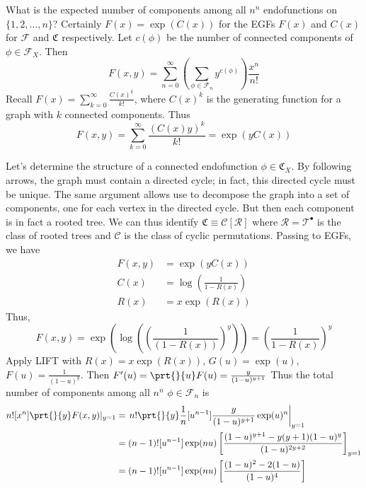 \documentclass[11pt, a4paper]{memoir}
\theoremstyle{change}
\theoremstyle{plain}
\theoremstyle{nonumberplain}
\numberwithin{equation}{section}
\begin{document}
What is the expected number of components among all $n^n$ endofunctions on $\{1,2,\ldots,n\}$?
Certainly $F(x)=\exp(C(x))$ for the EGFs $F(x)$ and $C(x)$ for $\mathcal{F}$ and $\mathfrak{C}$ respectively.
Let $c(\phi)$ be the number of connected components of $\phi\in\mathcal{F}_X$.
Then
\begin{equation*}
    F(x,y) = \sum_{n=0}^\infty\left(\sum_{\phi\in\mathcal{F}_n}y^{c(\phi)}\right)\frac{x^n}{n!}
\end{equation*}
Recall $F(x)=\sum_{k=0}^\infty\frac{C(x)^k}{k!}$, where $C(x)^k$ is the generating function for a graph with $k$ connected components.
Thus
\begin{equation*}
    F(x,y)=\sum_{k=0}^\infty\frac{(C(x)y)^k}{k!}=\exp(yC(x))
\end{equation*}

Let's determine the structure of a connected endofunction $\phi\in\mathfrak{C}_X$.
By following arrows, the graph must contain a directed cycle; in fact, this directed cycle must be unique.
The same argument allows use to decompose the graph into a set of components, one for each vertex in the directed cycle.
But then each component is in fact a rooted tree.
We can thus identify $\mathfrak{C}\equiv\mathcal{C}[\mathcal{R}]$ where $\mathcal{R}=\mathcal{T}^\bullet$ is the class of rooted trees and $\mathcal{C}$ is the class of cyclic permutations.
Passing to EGFs, we have
\begin{align*}
    F(x,y) &= \exp(yC(x))\\
    C(x) &= \log\left(\frac{1}{1-R(x)}\right)\\
    R(x) &= x\exp(R(x))
\end{align*}
Thus,
\begin{equation*}
    F(x,y)=\exp\left(\log\left(\left(\frac{1}{(1-R(x))}\right)^y\right)\right)=\left(\frac{1}{1-R(x)}\right)^y
\end{equation*}
Apply LIFT with $R(x)=x\exp(R(x))$, $G(u)=\exp(u)$, $F(u)=\frac{1}{(1-u)^y}$.
Then $F'(u)=\prt{}{u}F(u)=\frac{y}{(1-u)^{y+1}}$
Thus the total number of components among all $n^n$ $\phi\in\mathcal{F}_n$ is
\begin{align*}
    n![x^n]\prt{}{y}F(x,y)|_{y=1} &= \left.n!\prt{}{y}\frac{1}{n}[u^{n-1}]\frac{y}{(1-u)^{y+1}}\exp(u)^n\right|_{y=1}\\
                                  &=(n-1)![u^{n-1}]\exp(nu)\left[\frac{(1-u)^{y+1}-y(y+1)(1-u)^y}{(1-u)^{2y+2}}\right]_{y=1}\\
                                  &=(n-1)![u^{n-1}]\exp(nu)\left[\frac{(1-u)^{2}-2(1-u)}{(1-u)^{4}}\right]
\end{align*}
\end{document}
